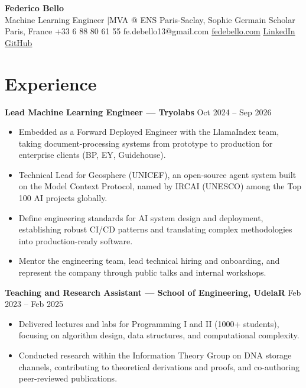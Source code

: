 \documentclass[10pt, letterpaper]{article}
\newenvironment{highlights}{
\begin{itemize}[topsep=0.06cm,itemsep=0pt,parsep=0pt,leftmargin=0.5cm]
}{
\end{itemize}
}
\begin{document}
\begin{center}
{\fontsize{22pt}{22pt}\textbf{Federico Bello}} \\[3pt]
\small
Machine Learning Engineer \quad$\vert$\quad MVA @ ENS Paris-Saclay, Sophie Germain Scholar \\[3pt]
Paris, France \quad
+33 6 88 80 61 55 \quad
fe.debello13@gmail.com \quad
\href{https://fedebello.com}{fedebello.com} \quad
\href{https://linkedin.com/in/federico-bello-}{LinkedIn} \quad
\href{https://github.com/fede-bello}{GitHub}
\end{center}

\section{Experience}

\textbf{Lead Machine Learning Engineer — Tryolabs} \hfill Oct 2024 -- Sep 2026

\begin{highlights}
\item Embedded as a Forward Deployed Engineer with the LlamaIndex team, taking document-processing systems from prototype to production for enterprise clients (BP, EY, Guidehouse).
\item Technical Lead for Geosphere (UNICEF), an open-source agent system built on the Model Context Protocol, named by IRCAI (UNESCO) among the Top 100 AI projects globally.
\item Define engineering standards for AI system design and deployment, establishing robust CI/CD patterns and translating complex methodologies into production-ready software.
\item Mentor the engineering team, lead technical hiring and onboarding, and represent the company through public talks and internal workshops.
\end{highlights}

\vspace{0.10cm}

\textbf{Teaching and Research Assistant — School of Engineering, UdelaR} \hfill Feb 2023 -- Feb 2025
\begin{highlights}
\item Delivered lectures and labs for Programming I and II (1000+ students), focusing on algorithm design, data structures, and computational complexity.
\item Conducted research within the Information Theory Group on DNA storage channels, contributing to theoretical derivations and proofs, and co-authoring peer-reviewed publications.
\end{highlights}
\end{document}
